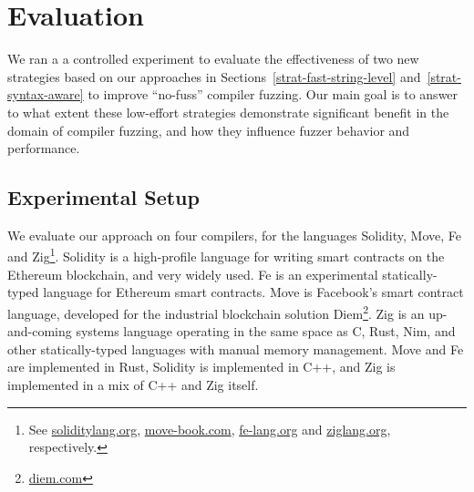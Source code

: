 \section{Evaluation}
\label{eval}

We ran a a controlled experiment to evaluate the effectiveness of two
new strategies based on our approaches in
Sections~\ref{strat-fast-string-level} and~\ref{strat-syntax-aware} to
improve ``no-fuss'' compiler fuzzing. Our main goal is to answer to what
extent these low-effort strategies demonstrate significant benefit in the
domain of compiler fuzzing, and how they influence fuzzer behavior and
performance.


\subsection{Experimental Setup}
\label{exp-setup}

\begin{sloppypar}
We evaluate our approach on four compilers, for the languages
Solidity,
Move, Fe
and
Zig\footnote{See
        \href{https://docs.soliditylang.org}{soliditylang.org},
        \href{https://move-book.com}{move-book.com},
        \href{https://fe-lang.org}{fe-lang.org} and
        \href{https://ziglang.org}{ziglang.org}, respectively.}.
Solidity is a high-profile language for writing smart contracts on the Ethereum
blockchain, and very widely used. Fe
is an experimental statically-typed language for Ethereum smart
contracts. Move is Facebook's smart contract language, developed for the
industrial blockchain solution Diem\footnote{\href{https://www.diem.com/en-us/}{diem.com}}. Zig
is an up-and-coming systems language operating in the same space as C, Rust,
Nim, and other statically-typed languages with manual memory management.
Move and Fe are implemented in Rust, Solidity is implemented in C++, and Zig is
implemented in a mix of C++ and Zig itself.
\end{sloppypar}


